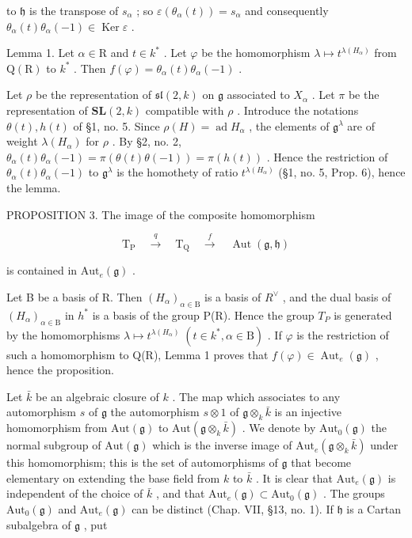 to \(\mathfrak{h}\) is the transpose of \(s_{\alpha}\) ; so \(\varepsilon(\theta_{\alpha}(t)) = s_{\alpha}\) and consequently \(\theta_{\alpha}(t)\theta_{\alpha}(-1) \in \operatorname{Ker} \varepsilon\) .

Lemma 1. Let \(\alpha \in \mathrm{R}\) and \(t\in k^{*}\) . Let \(\varphi\) be the homomorphism \(\lambda \mapsto t^{\lambda (H_{\alpha})}\) from \(\mathrm{Q(R)}\) to \(k^*\) . Then \(f(\varphi) = \theta_{\alpha}(t)\theta_{\alpha}(-1)\) .

Let \(\rho\) be the representation of \(\mathfrak{sl}(2,k)\) on \(\mathfrak{g}\) associated to \(X_{\alpha}\) . Let \(\pi\) be the representation of \(\mathbf{SL}(2,k)\) compatible with \(\rho\) . Introduce the notations \(\theta(t), h(t)\) of §1, no. 5. Since \(\rho(H) = \operatorname{ad} H_{\alpha}\) , the elements of \(\mathfrak{g}^{\lambda}\) are of weight \(\lambda(H_{\alpha})\) for \(\rho\) . By §2, no. 2, \(\theta_{\alpha}(t)\theta_{\alpha}(-1) = \pi(\theta(t)\theta(-1)) = \pi(h(t))\) . Hence the restriction of \(\theta_{\alpha}(t)\theta_{\alpha}(-1)\) to \(\mathfrak{g}^{\lambda}\) is the homothety of ratio \(t^{\lambda(H_{\alpha})}\) (§1, no. 5, Prop. 6), hence the lemma.

PROPOSITION 3. The image of the composite homomorphism

\[
\mathrm{T} _ {\mathrm{P}} \quad \xrightarrow {q} \quad \mathrm{T} _ {\mathrm{Q}} \quad \xrightarrow {f} \quad \operatorname{Aut} (\mathfrak {g}, \mathfrak {h})
\]

is contained in \(\mathrm{Aut}_e(\mathfrak{g})\) .

Let B be a basis of R. Then \((H_{\alpha})_{\alpha\in\mathrm{B}}\) is a basis of \(R^{\vee}\) , and the dual basis of \((H_{\alpha})_{\alpha\in\mathrm{B}}\) in \(h^{*}\) is a basis of the group P(R). Hence the group \(T_{P}\) is generated by the homomorphisms \(\lambda\mapsto t^{\lambda(H_{\alpha})}\;(t\in k^{*},\alpha\in\mathrm{B})\) . If \(\varphi\) is the restriction of such a homomorphism to Q(R), Lemma 1 proves that \(f(\varphi)\in\operatorname{Aut}_{e}(\mathfrak{g})\) , hence the proposition.

Let \(\bar{k}\) be an algebraic closure of \(k\) . The map which associates to any automorphism \(s\) of \(\mathfrak{g}\) the automorphism \(s \otimes 1\) of \(\mathfrak{g} \otimes_k \bar{k}\) is an injective homomorphism from \(\mathrm{Aut}(\mathfrak{g})\) to \(\mathrm{Aut}(\mathfrak{g} \otimes_k \bar{k})\) . We denote by \(\mathrm{Aut}_0(\mathfrak{g})\) the normal subgroup of \(\mathrm{Aut}(\mathfrak{g})\) which is the inverse image of \(\mathrm{Aut}_e(\mathfrak{g} \otimes_k \bar{k})\) under this homomorphism; this is the set of automorphisms of \(\mathfrak{g}\) that become elementary on extending the base field from \(k\) to \(\bar{k}\) . It is clear that \(\mathrm{Aut}_e(\mathfrak{g})\) is independent of the choice of \(\bar{k}\) , and that \(\mathrm{Aut}_e(\mathfrak{g}) \subset \mathrm{Aut}_0(\mathfrak{g})\) . The groups \(\mathrm{Aut}_0(\mathfrak{g})\) and \(\mathrm{Aut}_e(\mathfrak{g})\) can be distinct (Chap. VII, §13, no. 1). If \(\mathfrak{h}\) is a Cartan subalgebra of \(\mathfrak{g}\) , put

